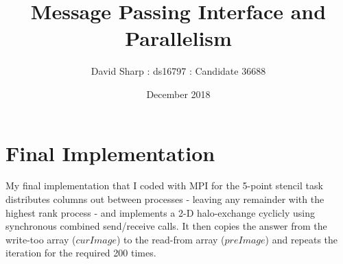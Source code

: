 \documentclass[10pt]{article}
\title{Message Passing Interface and Parallelism}
\author{David Sharp : ds16797 : Candidate 36688}
\date{December 2018}
\begin{document}
    \maketitle
    \section{Final Implementation}
    My final implementation that I coded with MPI for the 5-point stencil task distributes
    columns out between processes - leaving any remainder with the highest rank process - and
    implements a 2-D halo-exchange cyclicly using synchronous combined send/receive calls.
    It then copies the answer from the write-too array ($curImage$) to the read-from array
    ($preImage$) and repeats the iteration for the required 200 times. 



  
\end{document}
